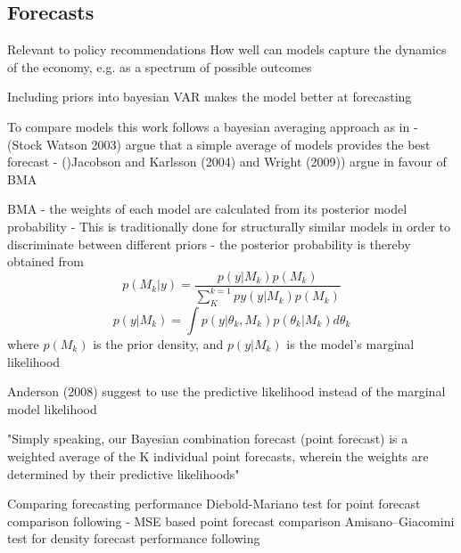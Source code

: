 \documentclass[11pt,a4paper,english]{article} %
\begin{document}
	
	
	
	
	
	
	\subsection{Forecasts}
	Relevant to policy recommendations
	How well can models capture the dynamics of the economy, e.g. as a spectrum of possible outcomes
	
	Including priors into bayesian VAR makes the model better at forecasting \cite{chin_bayesian_2019}
	
	
	To compare models this work follows a bayesian averaging approach as in \cite{chin_bayesian_2019}
	- (Stock Watson 2003) argue that a simple average of models provides the best forecast
	- ()Jacobson and Karlsson (2004) and Wright (2009)) argue in favour of BMA
	
	
	BMA
	- the weights of each model are calculated from its posterior model probability \cite{chin_bayesian_2019}
	- This is traditionally done for structurally similar models in order to discriminate between different priors
	- the posterior probability is thereby obtained from \cite{chin_bayesian_2019}
	\[
		p(M_k | y) = \frac{p(y | M_k) p(M_k)}{\sum_{K}^{k=1} py(y | M_k) p(M_k)}
	\]
	\[
		p(y | M_k) = \int p( y| \theta_k, M_k) p(\theta_k | M_k) d \theta_k
	\]
	where $p(M_k)$ is the prior density, and $p(y | M_k)$ is the model's marginal likelihood
	
	Anderson (2008) suggest to use the predictive likelihood instead of the marginal model likelihood
	
	"Simply speaking, our Bayesian combination forecast (point forecast) is a weighted average of the K individual point forecasts, wherein the weights are determined by their predictive likelihoods" \cite{chin_bayesian_2019}
	
	Comparing forecasting performance
	Diebold-Mariano test for point forecast comparison following \cite{chin_bayesian_2019}
	- MSE based point forecast comparison 
	Amisano–Giacomini test for density forecast performance following  \cite{chin_bayesian_2019}

	
	
	\pagebreak
	
\end{document}
